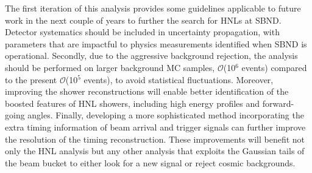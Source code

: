The first iteration of this analysis provides some guidelines applicable to future work in the next couple of years to further the search for HNLs at SBND.
Detector systematics should be included in uncertainty propagation, with parameters that are impactful to physics measurements identified when SBND is operational.
Secondly, due to the aggressive background rejection, the analysis should be performed on larger background MC samples, $\mathcal{O}$(10$^6$ events) compared to the present $\mathcal{O}$(10$^5$ events), to avoid statistical fluctuations.
Moreover, improving the shower reconstructions will enable better identification of the boosted features of HNL showers, including high energy profiles and forward-going angles.
Finally, developing a more sophisticated method incorporating the extra timing information of beam arrival and trigger signals can further improve the resolution of the timing reconstruction.
These improvements will benefit not only the HNL analysis but any other analysis that exploits the Gaussian tails of the beam bucket to either look for a new signal or reject cosmic backgrounds.

